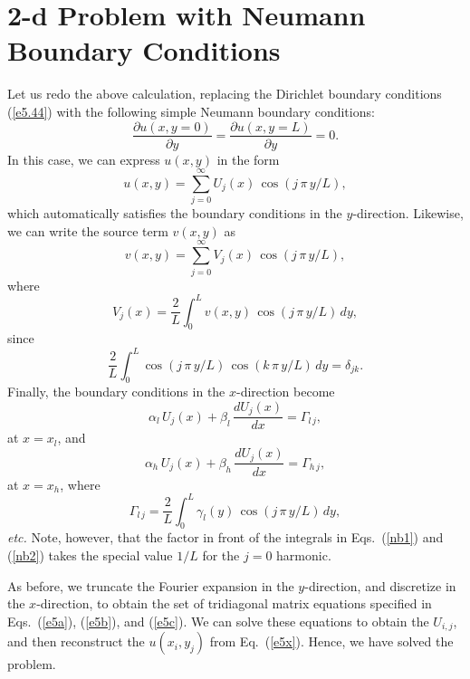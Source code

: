 \section{2-d Problem with Neumann Boundary Conditions}\label{fftcos}
Let us redo the above calculation, replacing the Dirichlet boundary conditions (\ref{e5.44})
with the following simple Neumann boundary conditions:
\begin{equation}
\frac{\partial u(x,y=0)}{\partial y} = \frac{\partial u(x,y=L)}{\partial y} = 0.
\end{equation}
In this case, we can express $u(x,y)$ in the form
\begin{equation}\label{e5x}
u(x,y) = \sum_{j=0}^{\infty} U_j(x)\,\cos(j\,\pi\,y/L),
\end{equation}
which automatically satisfies the boundary conditions in the $y$-direction. Likewise,
we can write the source term $v(x,y)$ as
\begin{equation}
v(x,y) = \sum_{j=0}^{\infty} V_j(x)\,\cos(j\,\pi\,y/L),
\end{equation}
where
\begin{equation}\label{nb1}
V_j(x) = \frac{2}{L} \int_0^L v(x,y)\,\cos(j\,\pi\,y/L)\,dy,
\end{equation}
since
\begin{equation}
\frac{2}{L}\int_0^L \cos(j\,\pi\,y/L)\,\cos(k\,\pi\,y/L)\,dy = \delta_{jk}.
\end{equation}
Finally, the boundary conditions in the $x$-direction become
\begin{equation}
\alpha_l\,U_j(x) + \beta_l\,\frac{dU_j(x)}{dx} = \Gamma_{l\,j},
\end{equation}
at $x=x_l$, and
\begin{equation}
\alpha_h \,U_j(x)+ \beta_h\,\frac{dU_j(x)}{dx} = \Gamma_{h\,j},
\end{equation}
at $x=x_h$, where
\begin{equation}\label{nb2}
\Gamma_{l\,j} = \frac{2}{L} \int_0^L \gamma_l(y)\,\cos(j\,\pi\,y/L)\,dy,
\end{equation}
{\em etc.} Note, however, that the factor in front of the integrals in Eqs.~(\ref{nb1})
and (\ref{nb2}) takes the special value $1/L$ for the $j=0$ harmonic.

As before, we truncate the Fourier expansion in the $y$-direction, and discretize in the
$x$-direction, to obtain the set of tridiagonal matrix equations specified in Eqs.~(\ref{e5a}), (\ref{e5b}), and (\ref{e5c}). We can solve these equations to obtain the $U_{i,j}$, and then reconstruct
the $u(x_i,y_j)$ from Eq.~(\ref{e5x}). Hence, we have solved the problem.

